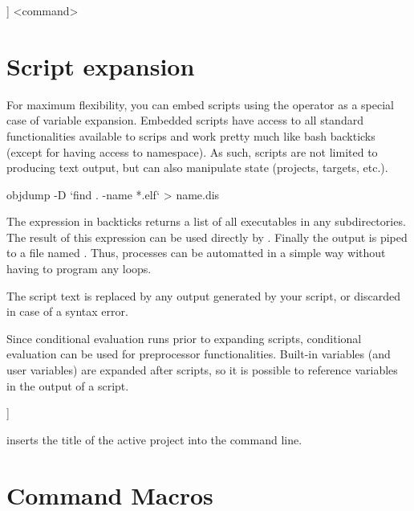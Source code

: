 \begin{code}
[[ if (PLATFORM ==  PLATFORM_MSW) { print (_T("cmd /c")); } else { print (_T("sh ")); } ]] <command>
\end{code}

\section{Script expansion}

For maximum flexibility, you can embed scripts using the \codeline{[[ ]]} operator as a special case of variable expansion. Embedded scripts have access to all standard functionalities available to scrips and work pretty much like bash backticks (except for having access to \codeblocks namespace). As such, scripts are not limited to producing text output, but can also manipulate \codeblocks state (projects, targets, etc.).



\begin{cmd}
objdump -D `find . -name *.elf` > name.dis
\end{cmd}

The expression in backticks returns a list of all executables  in any subdirectories. The result of this expression can be used directly by . Finally the output is piped to a file named  . Thus, processes can be automatted in a simple way without having to program any loops.


The script text is replaced by any output generated by your script, or discarded in case of a syntax error.

Since conditional evaluation runs prior to expanding scripts, conditional evaluation can be used for preprocessor functionalities. Built-in variables (and user variables) are expanded after scripts, so it is possible to reference variables in the output of a script.

\begin{code}
[[ print(GetProjectManager().GetActiveProject().GetTitle()); ]]
\end{code}

inserts the title of the active project into the command line.

\section{Command Macros}\label{sec:command_macros}

